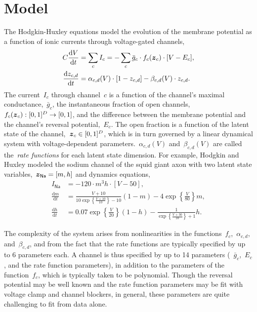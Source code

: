 \documentclass[aos]{imsart} %
\begin{document}
\section{Model}
The Hodgkin-Huxley equations model the evolution of the membrane potential as a function of ionic currents through voltage-gated channels, 
\begin{align}
C \frac{\mathrm{d} V}{\mathrm{d} t} &= \sum_{c} I_c = -\sum_{c} \bar{g}_c \cdot f_c(\bz_c) \cdot [V-E_c], \\
\nonumber 
\frac{\mathrm{d} z_{c,d}}{\mathrm{d} t} &= \alpha_{c,d}(V) \cdot [1-z_{c,d}] - \beta_{c,d}(V) \cdot z_{c,d}.
\end{align}
The current~$I_c$ through channel~$c$ is a function of the channel's maximal conductance,~$\bar{g}_c$, the instantaneous fraction of open channels,~${f_c(\boldsymbol{z}_c):[0,1]^D\to [0,1]}$, and the difference between the membrane potential and the channel's reversal potential,~$E_c$. The open fraction is a function of the latent state of the channel,~${\boldsymbol{z}_c\in [0,1]^D}$, which is in turn governed by a linear dynamical system with voltage-dependent parameters.~$\alpha_{c,d}(V)$ and~$\beta_{c,d}(V)$ are called the~\emph{rate functions} for each latent state dimension.  For example, Hodgkin and Huxley modeled the sodium channel of the  squid giant axon with two latent state variables,~$\boldsymbol{z}_{\mathsf{Na}}=[m,h]$ and dynamics equations,
\begin{align*}
I_{\mathsf{Na}} &= -120 \cdot m^3 h \cdot [V-50],\\
\frac{\mathrm{d} m}{\mathrm{d} t} &= \frac{V+10}{10\exp\left\{\frac{V+10}{10}\right\} -10} (1-m) - 4\exp\left\{\frac{V}{80}\right\} m, \\
\frac{\mathrm{d} h}{\mathrm{d} t} &= 0.07 \exp\left\{\frac{V}{20}\right\} (1-h)-   \frac{1}{\exp\left\{\frac{V+30}{10}\right\} +1} h.
\end{align*}

The complexity of the system arises from nonlinearities in the functions~$f_c$,~$\alpha_{c,d}$, and~$\beta_{c,d}$, and from the fact that the rate functions are typically specified by up to 6 parameters each. A channel is thus specified by up to 14 parameters (~$\bar{g}_c$,~$E_c$, and the rate function parameters), in addition to the parameters of the function~$f_c$, which is typically taken to be polynomial. Though the reversal potential may be well known and the rate function parameters may be fit with voltage clamp and channel blockers, in general, these parameters are quite challenging to fit from data alone.
\end{document}
